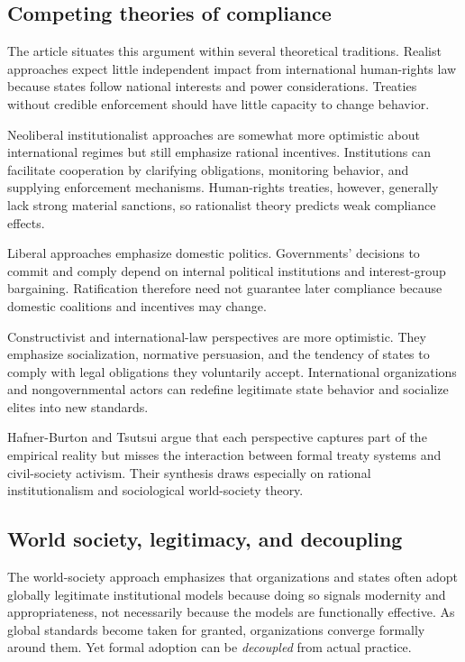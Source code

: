 \subsection{Competing theories of compliance}

The article situates this argument within several theoretical traditions. Realist approaches expect little independent impact from international human-rights law because states follow national interests and power considerations. Treaties without credible enforcement should have little capacity to change behavior.

Neoliberal institutionalist approaches are somewhat more optimistic about international regimes but still emphasize rational incentives. Institutions can facilitate cooperation by clarifying obligations, monitoring behavior, and supplying enforcement mechanisms. Human-rights treaties, however, generally lack strong material sanctions, so rationalist theory predicts weak compliance effects.

Liberal approaches emphasize domestic politics. Governments' decisions to commit and comply depend on internal political institutions and interest-group bargaining. Ratification therefore need not guarantee later compliance because domestic coalitions and incentives may change.

Constructivist and international-law perspectives are more optimistic. They emphasize socialization, normative persuasion, and the tendency of states to comply with legal obligations they voluntarily accept. International organizations and nongovernmental actors can redefine legitimate state behavior and socialize elites into new standards.

Hafner-Burton and Tsutsui argue that each perspective captures part of the empirical reality but misses the interaction between formal treaty systems and civil-society activism. Their synthesis draws especially on rational institutionalism and sociological world-society theory.

\subsection{World society, legitimacy, and decoupling}

The world-society approach emphasizes that organizations and states often adopt globally legitimate institutional models because doing so signals modernity and appropriateness, not necessarily because the models are functionally effective. As global standards become taken for granted, organizations converge formally around them. Yet formal adoption can be \textit{decoupled} from actual practice.

